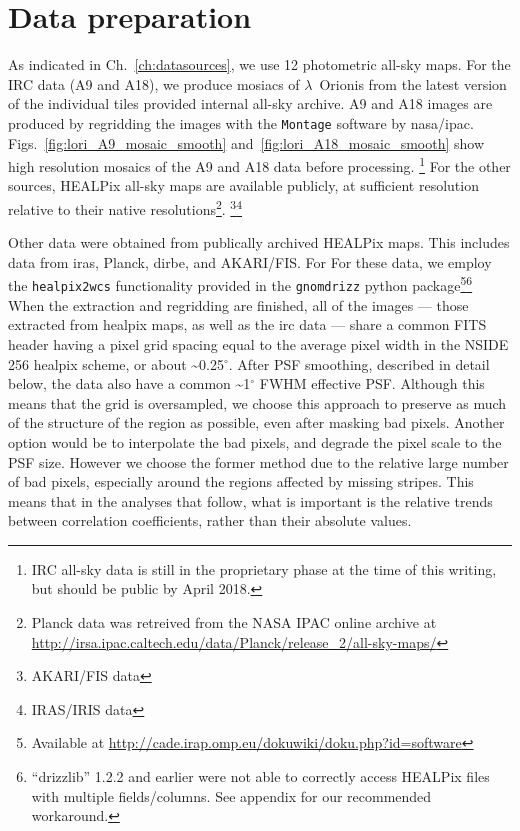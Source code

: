 	\section{Data preparation}
    \label{sec:dataprocessing}
		As indicated in Ch.~\ref{ch:datasources}, we use 12 photometric all-sky maps. For the IRC data (A9 and A18), we produce mosiacs of $\lambda$~Orionis from the latest version of the individual tiles provided internal all-sky archive. A9 and A18 images are produced by regridding the images with the {\tt Montage} software by \acrshort{nasa}/\acrshort{ipac}. Figs.~\ref{fig:lori_A9_mosaic_smooth} and~\ref{fig:lori_A18_mosaic_smooth} show high resolution mosaics of the A9 and A18 data before processing.
      \footnote{IRC all-sky data is still in the proprietary phase at the time of this writing, but should be public by April 2018.}
       For the other sources, HEALPix all-sky maps are available publicly, at sufficient resolution relative to their native resolutions\footnote{Planck data was retreived from the NASA IPAC online archive at \url{http://irsa.ipac.caltech.edu/data/Planck/release_2/all-sky-maps/}}. \footnote{AKARI/FIS data }\footnote{IRAS/IRIS data }

		  Other data were obtained from publically archived HEALPix maps. This includes data from \acrshort{iras}, Planck, \acrshort{dirbe}, and AKARI/FIS. For For these data, we employ the {\tt healpix2wcs} functionality provided in the {\tt gnomdrizz} python package\footnote{Available at \url{http://cade.irap.omp.eu/dokuwiki/doku.php?id=software}}\footnote{``drizzlib'' 1.2.2 and earlier were not able to correctly access HEALPix files with multiple fields/columns. See appendix for our recommended workaround.}   When the extraction and regridding are finished, all of the images --- those extracted from \acrshort{healpix} maps, as well as the \acrshort{irc} data --- share a common FITS header having a pixel grid spacing equal to the average pixel width in the NSIDE 256 \acrshort{healpix} scheme, or about \textasciitilde{0.25$^{\circ{}}$}. After PSF smoothing, described in detail below, the data also have a common \textasciitilde{1$^{\circ{}}$} FWHM effective PSF. Although this means that the grid is oversampled, we choose this approach to preserve as much of the structure of the region as possible, even after masking bad pixels. Another option would be to interpolate the bad pixels, and degrade the pixel scale to the PSF size. However we choose the former method due to the relative large number of bad pixels, especially around the regions affected by missing stripes. This means that in the analyses that follow, what is important is the relative trends between correlation coefficients, rather than their absolute values.


